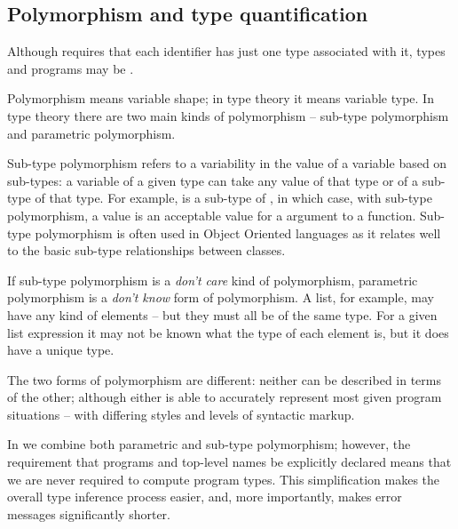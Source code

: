 \subsection{Polymorphism and type quantification}
Although \go requires that each identifier has just one type associated with it, types and programs may be . 

Polymorphism means variable shape; in type theory it means variable type. In type theory there are two main kinds of polymorphism -- sub-type polymorphism and parametric polymorphism.

Sub-type polymorphism refers to a variability in the value of a variable based on sub-types: a variable of a given type can take any value of that type or of a sub-type of that type. For example,  is a sub-type of , in which case, with sub-type polymorphism, a  value is an acceptable value for a  argument to a function. Sub-type polymorphism is often used in Object Oriented languages as it relates well to the basic sub-type relationships between classes. 

If sub-type polymorphism is a \emph{don't care} kind of polymorphism, parametric polymorphism is a \emph{don't know} form of polymorphism. A \go list, for example, may have any kind of elements -- but they must all be of the same type. For a given list expression it may not be known what the type of each element is, but it does have a unique type. 

The two forms of polymorphism are different: neither can be described in terms of the other; although either is able to accurately represent most given program situations -- with differing styles and levels of syntactic markup. 

In \go we combine both parametric and sub-type polymorphism; however, the requirement that programs and top-level names be explicitly declared means that we are never required to compute program types. This simplification makes the overall type inference process easier, and, more importantly, makes error messages significantly shorter.


